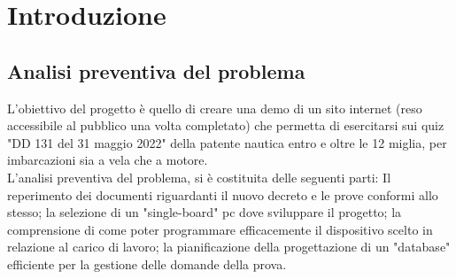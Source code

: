 \chapter{Introduzione}\label{cap:Introduzione}

\section{Analisi preventiva del problema}\label{sez:Analisi preventiva}
\raggedright
L'obiettivo del progetto è quello di creare una demo di un sito internet (reso accessibile al pubblico una volta completato) che permetta di esercitarsi sui quiz "DD 131 del 31 maggio 2022" della patente nautica entro e oltre le 12 miglia, per imbarcazioni sia a vela che a motore.\\
L'analisi preventiva del problema, si è costituita delle seguenti parti: Il reperimento dei documenti riguardanti il nuovo decreto e le prove conformi allo stesso; la selezione di un "single-board" pc dove sviluppare il progetto; la comprensione di come poter programmare efficacemente il dispositivo scelto in relazione al carico di lavoro; la pianificazione della progettazione di un "database" efficiente per la gestione delle domande della prova.\\

